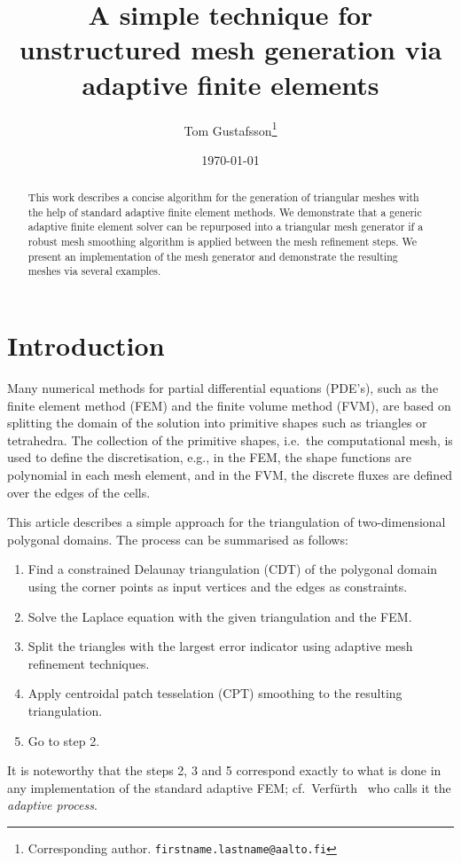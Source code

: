\documentclass[12pt]{rmstyle}
\author{Tom Gustafsson\footnote{Corresponding author. \texttt{firstname.lastname@aalto.fi}}}
\date{\today}
\title{A simple technique for unstructured mesh generation via adaptive finite elements}
\begin{document}
\newcommand*\DNA{\textsc{dna}}

\newcommand*\Let[2]{\State #1 $\gets$ #2}
\algrenewcommand{}
\algrenewcommand{}

\maketitle

\begin{abstract}
  This work describes a concise algorithm for the generation of triangular
  meshes with the help of standard adaptive finite element methods.  We
  demonstrate that a generic adaptive finite element solver can be repurposed
  into a triangular mesh generator if a robust mesh smoothing algorithm is
  applied between the mesh refinement steps.  We present an implementation of
  the mesh generator and demonstrate the resulting meshes via several examples.
\end{abstract}

\section{Introduction}
\label{sec:orge4667b0}

Many numerical methods for partial differential equations (PDE's), such as the
finite element method (FEM) and the finite volume method (FVM), are based on
splitting the domain of the solution into primitive shapes such as triangles or
tetrahedra.  The collection of the primitive shapes, i.e.~the computational
mesh, is used to define the discretisation, e.g., in the FEM, the shape
functions are polynomial in each mesh element, and in the FVM, the discrete
fluxes are defined over the edges of the cells.

This article describes a simple approach for the triangulation of
two-dimensional polygonal domains.  The process can be summarised as follows:
\begin{enumerate}
\item Find a constrained Delaunay triangulation (CDT) of the polygonal domain
      using the corner points as input vertices and the edges
      as constraints.
\item Solve the Laplace equation with the given triangulation
      and the FEM.
\item Split
      the triangles with the largest error indicator
      using adaptive mesh refinement techniques.
\item Apply centroidal patch tesselation (CPT) smoothing to the resulting
  triangulation.
\item Go to step 2.
\end{enumerate}
It is noteworthy that the steps 2, 3 and 5 correspond exactly to what is done in
any implementation of the standard adaptive FEM;
cf.~Verf\"{u}rth~\cite{Verf_rth_2013} who calls it the \emph{adaptive process}.
\end{document}
